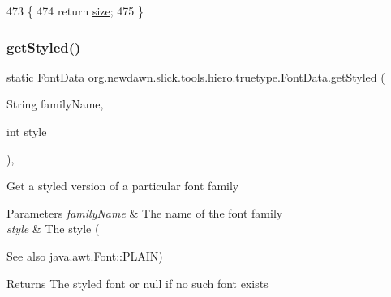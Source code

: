 \begin{DoxyCode}
473                            \{
474         \textcolor{keywordflow}{return} \mbox{\hyperlink{classorg_1_1newdawn_1_1slick_1_1tools_1_1hiero_1_1truetype_1_1_font_data_a96af538e2a7368fdba46ffc2ad6a9a0e}{size}};
475     \}
\end{DoxyCode}
\mbox{\label{classorg_1_1newdawn_1_1slick_1_1tools_1_1hiero_1_1truetype_1_1_font_data_a06cde06f668d43b61523d65ae1d74055}} 
\subsubsection{\texorpdfstring{get\+Styled()}{getStyled()}}
{\footnotesize\ttfamily static \mbox{\hyperlink{classorg_1_1newdawn_1_1slick_1_1tools_1_1hiero_1_1truetype_1_1_font_data}{Font\+Data}} org.\+newdawn.\+slick.\+tools.\+hiero.\+truetype.\+Font\+Data.\+get\+Styled (\begin{DoxyParamCaption}\item[{String}]{family\+Name,  }\item[{int}]{style }\end{DoxyParamCaption})\hspace{0.3cm}{\ttfamily [inline]}, {\ttfamily [static]}}

Get a styled version of a particular font family


\begin{DoxyParams}{Parameters}
{\em family\+Name} & The name of the font family \\
\hline
{\em style} & The style (\\
\hline
\end{DoxyParams}
\begin{DoxySeeAlso}{See also}
java.\+awt.\+Font\+::\+P\+L\+A\+IN) 
\end{DoxySeeAlso}
\begin{DoxyReturn}{Returns}
The styled font or null if no such font exists 
\end{DoxyReturn}

